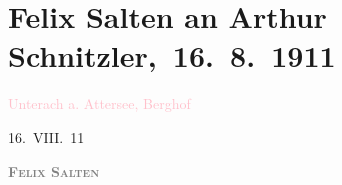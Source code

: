 

\renewcommand{\erwaehntePersonen}{Personen: Raoul Auernheimer, Moriz Benedikt, Samuel Fischer, Felix Salten, Ottilie Salten}
\renewcommand{\erwaehnteInstitutionen}{Institutionen: Die Zeit, Neue Freie Presse}
\renewcommand{\erwaehnteOrte}{Orte: Bad Gastein, Berghof, Semmering, St. Gilgen, Unterach am Attersee, Wien, Österreich}
\renewcommand{\erwaehnteWerke}{Werke: Erinnerungen}
\section[ Felix Salten an Arthur Schnitzler, 16. 8. 1911]{Felix Salten an Arthur Schnitzler, 16. 8. 1911}
\nopagebreak{}
\rehead{ }\normalsize\beginnumbering{}
\toendnotes[C]{\smallbreak\pagebreak[2]}
\toendnotes[C]{\smallbreak}
\pstart
           \noindent{}\raggedleft{}{\pb}\textcolor{pink}{Unterach a. Attersee, Berghof}{}\ledrightnote{\textcolor{pink}{Berghof}}\pend
           
\pstart
           \raggedleft{}16. VIII. 11\pend
           
\pstart
           \textcolor{gray}{\textbf{\textsc{Felix Salten}}}\pend
           
